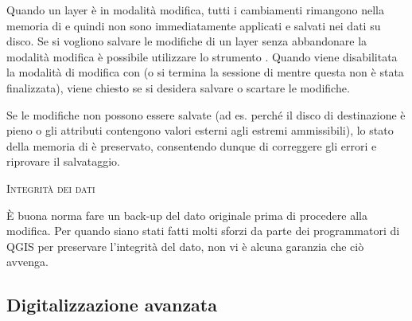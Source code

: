
Quando un layer è in modalità modifica, tutti i cambiamenti rimangono nella
memoria di \qg e quindi non sono immediatamente applicati e salvati nei dati
su disco. Se si vogliono salvare le modifiche di un layer senza abbandonare la
modalità modifica è possibile utilizzare lo strumento .
Quando viene disabilitata la modalità di modifica con  
(o si termina la sessione di \qg mentre questa non è stata finalizzata), 
viene chiesto se si desidera salvare o scartare le modifiche.

Se le modifiche non possono essere salvate (ad es. perché il disco di
destinazione è pieno o gli attributi contengono valori esterni agli estremi
ammissibili), lo stato della memoria di \qg è preservato, consentendo dunque
di correggere gli errori e riprovare il salvataggio.

\begin{Tip}\caption{\textsc{Integrità dei dati}}
È buona norma fare un back-up del dato originale prima di procedere
alla modifica. Per quando siano stati fatti molti sforzi da parte dei
programmatori di QGIS per preservare l'integrità del dato, non vi è alcuna
garanzia che ciò avvenga.
\end{Tip}

\subsection{Digitalizzazione avanzata}
\label{sec:advanced_edit}

